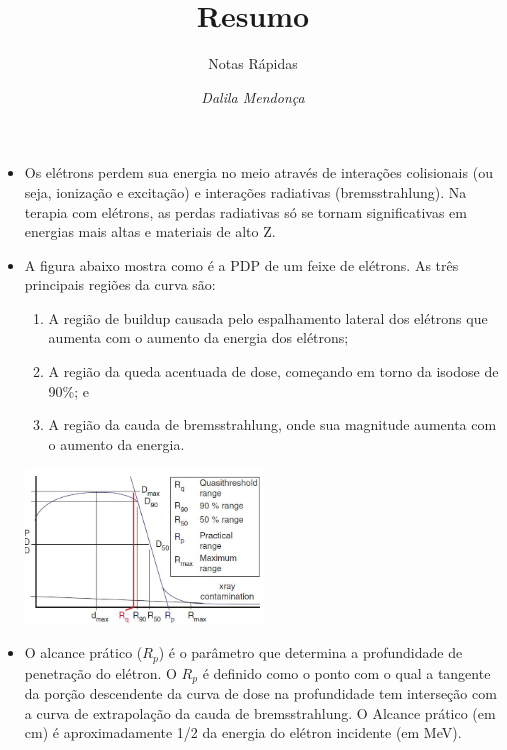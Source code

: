 \documentclass[11pt,a4paper]{article}
\title{Resumo}
\author{Notas Rápidas \nocite{*}}
\date{\textit{Dalila Mendonça}}
\newcounter{exemplo}
\begin{document}
	\maketitle


\begin{exemplo}
    \begin{itemize}
        \item Os elétrons perdem sua energia no meio através de interações colisionais (ou seja, ionização e excitação) e interações radiativas (bremsstrahlung). Na terapia com elétrons, as perdas radiativas só se tornam significativas em energias mais altas e materiais de alto Z.
        
        \item A figura abaixo mostra como é a PDP de um feixe de elétrons. As três principais regiões da curva são:
        
            \begin{enumerate}[label=\roman*.]
                \item A região de buildup causada pelo espalhamento lateral dos elétrons que aumenta com o aumento da energia dos elétrons;
                \item A região da queda acentuada de dose, começando em torno da isodose de 90\%; e 
                \item A região da cauda de bremsstrahlung, onde sua magnitude aumenta com o aumento da energia.
            \end{enumerate}
        
            \begin{center}
                \includegraphics[width=0.5\textwidth]{Imagens/pdpEletrons.JPG}
            \end{center}

        \item O alcance prático ($R_p$) é o parâmetro que determina a profundidade de penetração do elétron. O $R_p$ é definido como o ponto com o qual a tangente da porção descendente da curva de dose na profundidade tem interseção com a curva de extrapolação da cauda de bremsstrahlung. O Alcance prático (em cm) é aproximadamente 1/2 da energia do elétron incidente (em MeV).
        

\end{itemize}
\end{exemplo}
\end{document}
